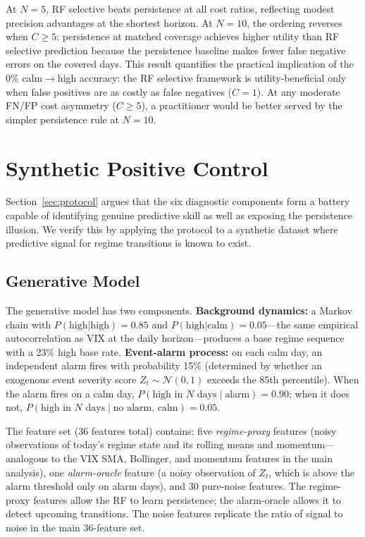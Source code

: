 \documentclass[11pt]{article}
\begin{document}
At $N = 5$, RF selective beats persistence at all cost ratios, reflecting modest precision advantages at the shortest horizon. At $N = 10$, the ordering reverses when $C \geq 5$: persistence at matched coverage achieves higher utility than RF selective prediction because the persistence baseline makes fewer false negative errors on the covered days. This result quantifies the practical implication of the 0\% calm$\to$high accuracy: the RF selective framework is utility-beneficial only when false positives are as costly as false negatives ($C = 1$). At any moderate FN/FP cost asymmetry ($C \geq 5$), a practitioner would be better served by the simpler persistence rule at $N = 10$.

\section{Synthetic Positive Control}
\label{sec:synthetic}

Section~\ref{sec:protocol} argues that the six diagnostic components form a battery capable of identifying genuine predictive skill as well as exposing the persistence illusion. We verify this by applying the protocol to a synthetic dataset where predictive signal for regime transitions is known to exist.

\subsection{Generative Model}

The generative model has two components. \textbf{Background dynamics:} a Markov chain with $P(\text{high}|\text{high}) = 0.85$ and $P(\text{high}|\text{calm}) = 0.05$---the same empirical autocorrelation as VIX at the daily horizon---produces a base regime sequence with a 23\% high base rate. \textbf{Event-alarm process:} on each calm day, an independent alarm fires with probability 15\% (determined by whether an exogenous event severity score $Z_t \sim \mathcal{N}(0,1)$ exceeds the 85th percentile). When the alarm fires on a calm day, $P(\text{high in } N \text{ days} \mid \text{alarm}) = 0.90$; when it does not, $P(\text{high in } N \text{ days} \mid \text{no alarm, calm}) = 0.05$.

The feature set (36 features total) contains: five \emph{regime-proxy} features (noisy observations of today's regime state and its rolling means and momentum---analogous to the VIX SMA, Bollinger, and momentum features in the main analysis), one \emph{alarm-oracle} feature (a noisy observation of $Z_t$, which is above the alarm threshold only on alarm days), and 30 pure-noise features. The regime-proxy features allow the RF to learn persistence; the alarm-oracle allows it to detect upcoming transitions. The noise features replicate the ratio of signal to noise in the main 36-feature set.
\end{document}
